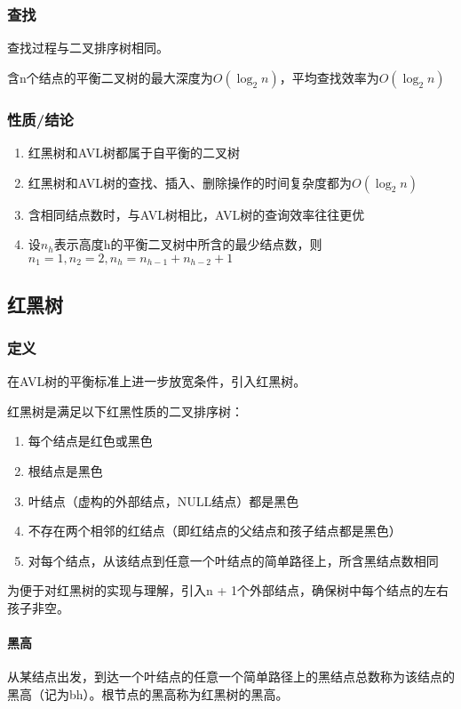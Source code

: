 \subsubsection{查找}
查找过程与二叉排序树相同。

含n个结点的平衡二叉树的最大深度为\(O(\log_2n)\)，平均查找效率为\(O(\log_2n)\)

\subsubsection{性质/结论}
\begin{enumerate}
    \item 红黑树和AVL树都属于自平衡的二叉树
    \item 红黑树和AVL树的查找、插入、删除操作的时间复杂度都为\(O(\log_2n)\)
    \item 含相同结点数时，与AVL树相比，AVL树的查询效率往往更优
    \item 设\(n_h\)表示高度h的平衡二叉树中所含的最少结点数，则\(n_1 = 1, n_2 = 2, n_h = n_{h - 1} + n_{h - 2} + 1\)
\end{enumerate}


\subsection{红黑树}
\subsubsection{定义}
在AVL树的平衡标准上进一步放宽条件，引入红黑树。

红黑树是满足以下红黑性质的二叉排序树：
\begin{enumerate}
    \item 每个结点是红色或黑色
    \item 根结点是黑色
    \item 叶结点（虚构的外部结点，NULL结点）都是黑色
    \item 不存在两个相邻的红结点（即红结点的父结点和孩子结点都是黑色）
    \item 对每个结点，从该结点到任意一个叶结点的简单路径上，所含黑结点数相同
\end{enumerate}
为便于对红黑树的实现与理解，引入n + 1个外部结点，确保树中每个结点的左右孩子非空。

\paragraph{黑高}
从某结点出发，到达一个叶结点的任意一个简单路径上的黑结点总数称为该结点的黑高（记为bh）。根节点的黑高称为红黑树的黑高。


